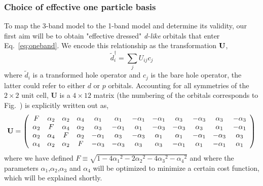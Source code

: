 \documentclass[prl,12pt,onecolumn,nofootinbib,notitlepage,english,superscriptaddress]{revtex4-1}
\newcommand{\HJC}[1]{{\color{RED}{\bf HJC: #1}}}
\begin{document}
%

\subsubsection{Choice of effective one particle basis}
To map the 3-band model to the 1-band model and determine its validity, 
our first aim will be to obtain "effective dressed" \emph{d-like} 
orbitals that enter Eq.~\ref{eq:oneband}. We encode this relationship as 
the transformation ${\bf U}$, 
\begin{equation}
	\tilde{d}_i^{\dagger} = \sum_{j} U_{ij} c_j
\end{equation}
where $\tilde{d}_i$ is a transformed hole operator and $c_j$ is the bare hole
operator, the latter could refer to either $d$ or $p$ orbitals. Accounting for all symmetries of 
the $2\times2$ unit cell, {\bf U} is a $4 \times 12 $ matrix (the numbering of the orbitals 
corresponds to Fig.~) is explicitly written out as, 
\begin{eqnarray}
{\bf U} = 
\left(
\begin{array}{cccccccccccc}
F        & \alpha_2 &        \alpha_2 &  \alpha_4 & \alpha_1 & \alpha_1 & -\alpha_1 & -\alpha_1 & \alpha_3 & -\alpha_3 & \alpha_3 & -\alpha_3 \\
\alpha_2 &  F       &        \alpha_4 &  \alpha_2 & \alpha_3 & -\alpha_1 & \alpha_1 & -\alpha_3 & -\alpha_3 & \alpha_3 & \alpha_1 & -\alpha_1 \\
\alpha_2 & \alpha_4 & F               &  \alpha_2 & -\alpha_1 & \alpha_3 & -\alpha_3 & \alpha_1 & \alpha_1 & -\alpha_1 & -\alpha_3 & \alpha_3 \\
\alpha_4 & \alpha_2 & \alpha_2        &   F       & -\alpha_3 & -\alpha_3 & \alpha_3 & \alpha_3 & -\alpha_1 & \alpha_1 & -\alpha_1 & \alpha_1 \\
\end{array}
\right)
\end{eqnarray}
where we have defined $F \equiv \sqrt{1-4{\alpha_1}^2 - 2{\alpha_2}^2 - 4 {\alpha_3}^2 -{\alpha_4}^2}$ and 
where the parameters $\alpha_1$,$\alpha_2$,$\alpha_3$ and $\alpha_4$ will be 
optimized to minimize a certain cost function, which will be explained shortly. 
\end{document}
